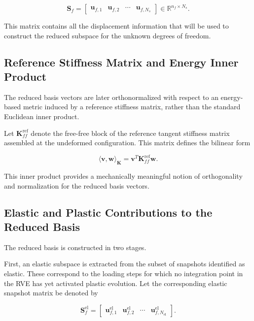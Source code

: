 \documentclass[11pt,a4paper]{article}
\begin{document}
\begin{equation}
\mathbf{S}_f
=
\begin{bmatrix}
\mathbf{u}_{f,1} &
\mathbf{u}_{f,2} &
\cdots &
\mathbf{u}_{f,N_s}
\end{bmatrix}
\in
\mathbb{R}^{n_f \times N_s}.
\end{equation}

This matrix contains all the displacement information that will be used to construct the reduced subspace for the unknown degrees of freedom.

\subsection{Reference Stiffness Matrix and Energy Inner Product}

The reduced basis vectors are later orthonormalized with respect to an energy-based metric induced by a reference stiffness matrix, rather than the standard Euclidean inner product.

Let $\mathbf{K}_{ff}^{\mathrm{ref}}$ denote the free-free block of the reference tangent stiffness matrix assembled at the undeformed configuration. This matrix defines the bilinear form

\begin{equation}
\langle \mathbf{v}, \mathbf{w} \rangle_{\mathbf{K}}
=
\mathbf{v}^{T}\mathbf{K}_{ff}^{\mathrm{ref}}\mathbf{w}.
\end{equation}

This inner product provides a mechanically meaningful notion of orthogonality and normalization for the reduced basis vectors.

\subsection{Elastic and Plastic Contributions to the Reduced Basis}

The reduced basis is constructed in two stages.

First, an elastic subspace is extracted from the subset of snapshots identified as elastic. These correspond to the loading steps for which no integration point in the RVE has yet activated plastic evolution. Let the corresponding elastic snapshot matrix be denoted by

\begin{equation}
\mathbf{S}_f^{\mathrm{el}}
=
\begin{bmatrix}
\mathbf{u}_{f,1}^{\mathrm{el}} &
\mathbf{u}_{f,2}^{\mathrm{el}} &
\cdots &
\mathbf{u}_{f,N_{\mathrm{el}}}^{\mathrm{el}}
\end{bmatrix}.
\end{equation}
\end{document}
